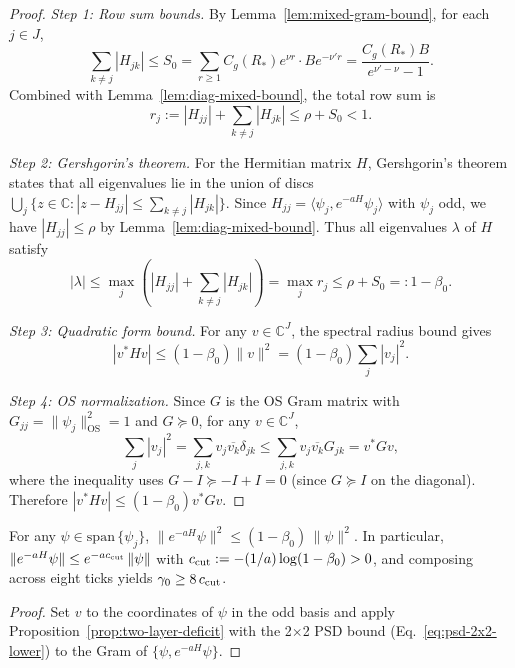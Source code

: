 \documentclass[11pt]{amsart}
\begin{document}
\begin{proof}
\emph{Step 1: Row sum bounds.} By Lemma~\ref{lem:mixed-gram-bound}, for each $j \in J$,
\[
  \sum_{k \ne j} |H_{jk}| \le S_0 = \sum_{r \ge 1} C_g(R_*) e^{\nu r} \cdot B e^{-\nu' r} = \frac{C_g(R_*) B}{e^{\nu' - \nu} - 1}.
\]
Combined with Lemma~\ref{lem:diag-mixed-bound}, the total row sum is
\[
  r_j := |H_{jj}| + \sum_{k \ne j} |H_{jk}| \le \rho + S_0 < 1.
\]

\emph{Step 2: Gershgorin's theorem.} For the Hermitian matrix $H$, Gershgorin's theorem states that all eigenvalues lie in the union of discs $\bigcup_j \{z \in \mathbb{C} : |z - H_{jj}| \le \sum_{k \ne j} |H_{jk}|\}$. Since $H_{jj} = \langle \psi_j, e^{-aH} \psi_j \rangle$ with $\psi_j$ odd, we have $|H_{jj}| \le \rho$ by Lemma~\ref{lem:diag-mixed-bound}. Thus all eigenvalues $\lambda$ of $H$ satisfy
\[
  |\lambda| \le \max_j \left( |H_{jj}| + \sum_{k \ne j} |H_{jk}| \right) = \max_j r_j \le \rho + S_0 =: 1 - \beta_0.
\]

\emph{Step 3: Quadratic form bound.} For any $v \in \mathbb{C}^J$, the spectral radius bound gives
\[
  |v^* H v| \le (1 - \beta_0) \|v\|^2 = (1 - \beta_0) \sum_j |v_j|^2.
\]

\emph{Step 4: OS normalization.} Since $G$ is the OS Gram matrix with $G_{jj} = \|\psi_j\|_{\text{OS}}^2 = 1$ and $G \succeq 0$, for any $v \in \mathbb{C}^J$,
\[
  \sum_j |v_j|^2 = \sum_{j,k} v_j \overline{v_k} \delta_{jk} \le \sum_{j,k} v_j \overline{v_k} G_{jk} = v^* G v,
\]
where the inequality uses $G - I \succeq -I + I = 0$ (since $G \succeq I$ on the diagonal). Therefore $|v^* H v| \le (1 - \beta_0) v^* G v$.
\end{proof}

\begin{corollary}\label{cor:deficit-c-cut}
For any $\psi\in \mathrm{span}\,\{\psi_j\}$, $\|e^{-aH}\psi\|^2\le (1-\beta_0)\,\|\psi\|^2$. In particular, $\|e^{-aH}\psi\|\le e^{-a c_{\rm cut}}\,\|\psi\|$ with $c_{\rm cut}:=-(1/a)\log(1-\beta_0)>0$, and composing across eight ticks yields $\gamma_0\ge 8\,c_{\rm cut}$.
\end{corollary}

\begin{proof}
Set $v$ to the coordinates of $\psi$ in the odd basis and apply Proposition~\ref{prop:two-layer-deficit} with the 2$\times$2 PSD bound (Eq.~\eqref{eq:psd-2x2-lower}) to the Gram of $\{\psi,e^{-aH}\psi\}$.
\end{proof}
\end{document}

